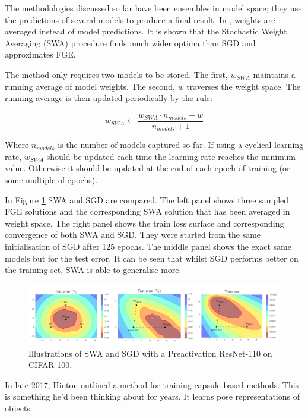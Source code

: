 The methodologies discussed so far have been ensembles in model space; they use the predictions of several models to produce a final result.
In \cite{Izmailov_Podoprikhin_Garipov_Vetrov_Wilson_2018}, weights are averaged instead of model predictions.
It is shown that the Stochastic Weight Averaging (SWA) procedure finds much wider optima than SGD and approximates FGE.

The method only requires two models to be stored.
The first, $w_{SWA}$ maintains a running average of model weights.
The second, $w$ traverses the weight space.
The running average is then updated periodically by the rule:

\begin{equation}
    w_{SWA} \leftarrow \frac{w_{SWA} \cdot n_{models} + w}{n_{models} + 1}
    \label{eq:swa}
\end{equation}

Where $n_{models}$ is the number of models captured so far.
If using a cyclical learning rate, $w_{SWA}$ should be updated each time the learning rate reaches the minimum value.
Otherwise it should be updated at the end of each epoch of training (or some multiple of epochs).

In Figure \ref{fig:SWA} SWA and SGD are compared.
The left panel shows three sampled FGE solutions and the corresponding SWA solution that has been averaged in weight space.
The right panel shows the train loss surface and corresponding convergence of both SWA and SGD.
They were started from the same initialisation of SGD after 125 epochs.
The middle panel shows the exact same models but for the test error.
It can be seen that whilst SGD performs better on the training set, SWA is able to generalise more.

\begin{figure}[hbtp!]
    \centering
    \includegraphics[width=\textwidth]{./img/SWA.png}
    \caption{Illustrations of SWA and SGD with a Preactivation ResNet-110 on CIFAR-100. \cite{Izmailov_Podoprikhin_Garipov_Vetrov_Wilson_2018}}
    \label{fig:SWA}
\end{figure}


In late 2017, Hinton outlined a method for training capsule based methods.
This is something he'd been thinking about for years.
It learns pose representations of objects. \cite{Hinton_Sabour_Frosst_2018, Sabour_Frosst_Hinton_2017}





